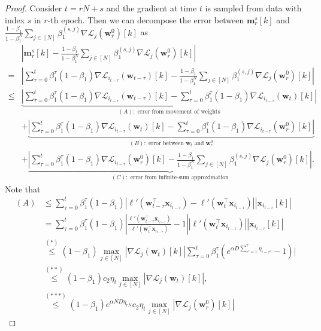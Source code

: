 \documentclass{article} %
\theoremstyle{plain}
\theoremstyle{definition}
\theoremstyle{remark}
\newcommand{\Ls}{\mathcal{L}}
\def\bm{{\mathbf m}}
\def\bx{{\mathbf x}}
\def\bw{{\mathbf w}}
\begin{document}
\begin{proof}
    Consider $t = rN+s$ and the gradient at time $t$ is sampled from data with index $s$ in $r$-th epoch. Then we can decompose the error between $\bm_r^s[k]$ and $\frac{1-\beta_1}{1-\beta_1^N}\sum_{j \in [N]}\beta_1^{(s, j)}\nabla\Ls_{j}(\bw_r^0)[k]$ as 
    \begin{align*}
        &|\bm_r^s[k]-\frac{1-\beta_1}{1-\beta_1^N}\sum_{j \in [N]}\beta_1^{(s, j)}\nabla\Ls_{j}(\bw_r^0)[k]| \\
        =& |\sum_{\tau=0}^{t}\beta_1^\tau(1-\beta_1)\nabla \Ls_{i_{t-\tau}}(\bw_{t-\tau})[k] - \frac{1-\beta_1}{1-\beta_1^N}\sum_{j \in [N]}\beta_1^{(s, j)}\nabla\Ls_{j}(\bw_r^0)[k]| \\
        \leq& \underbrace{|\sum_{\tau=0}^{t}\beta_1^\tau(1-\beta_1)\nabla \Ls_{i_{t-\tau}}(\bw_{t-\tau})[k] - \sum_{\tau=0}^{t}\beta_1^\tau(1-\beta_1)\nabla \Ls_{i_{t-\tau}}(\bw_t)[k]|}_{(A): \text{ error from movement of weights}} \\
        &+ \underbrace{|\sum_{\tau=0}^{t}\beta_1^\tau(1-\beta_1)\nabla \Ls_{i_{t-\tau}}(\bw_t)[k] - \sum_{\tau=0}^{t}\beta_1^\tau(1-\beta_1)\nabla \Ls_{i_{t-\tau}}(\bw_r^0)[k]|}_{(B): \text{ error between $\bw_t$ and $\bw_r^0$}}\\
        &+ \underbrace{|\sum_{\tau=0}^{t}\beta_1^\tau(1-\beta_1)\nabla \Ls_{i_{t-\tau}}(\bw_r^0)[k] - \frac{1-\beta_1}{1-\beta_1^N}\sum_{j \in [N]}\beta_1^{(s, j)}\nabla\Ls_{j}(\bw_r^0)[k]|}_{(C): \text{ error from infinite-sum approximation}}.
    \end{align*}
    Note that
    \begin{align*}
        (A)&\leq \sum_{\tau=0}^t \beta_1^\tau(1-\beta_1)|\ell'(\bw_{t-\tau}^\top \bx_{i_{t-\tau}}) - \ell'(\bw_t^\top \bx_{i_{t-\tau}})||\bx_{i_{t-\tau}}[k]| \\
        &= \sum_{\tau=0}^t \beta_1^\tau(1-\beta_1)\left|\frac{\ell'(\bw_{t-\tau}^\top \bx_{i_{t-\tau}})}{\ell'(\bw_t^\top \bx_{i_{t-\tau}})} - 1\right||\ell'(\bw_t^\top \bx_{i_{t-\tau}})||\bx_{i_{t-\tau}}[k]| \\
        & \overset{(*)}{\leq} (1-\beta_1)\max_{j \in [N]}|\nabla \Ls_j(\bw_t)[k]|\sum_{\tau=0}^t \beta_1^\tau(e^{\alpha D\sum_{\tau'=1}^\tau \eta_{t-\tau'}}-1)|\\
        & \overset{(**)}{\leq} (1-\beta_1)c_2\eta_t\max_{j \in [N]}|\nabla \Ls_j(\bw_t)[k]|, \\
        & \overset{({***})}{\leq}(1-\beta_1)e^{\alpha ND \eta_{rN}}c_2\eta_t\max_{j \in [N]}|\nabla \Ls_j(\bw_r^0)[k]|
    \end{align*}

\end{proof}
\end{document}
